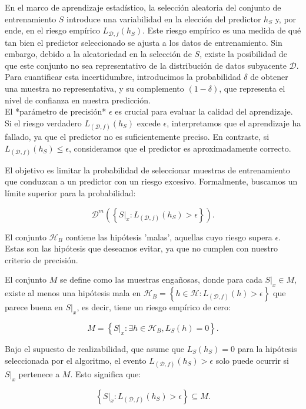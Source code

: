 En el marco de aprendizaje estadístico, la selección aleatoria del conjunto de entrenamiento $S$ introduce una variabilidad en la elección del predictor $h_S$ y, por ende, en el riesgo empírico $L_{\mathcal{D},f}(h_S)$. Este riesgo empírico es una medida de qué tan bien el predictor seleccionado se ajusta a los datos de entrenamiento. Sin embargo, debido a la aleatoriedad en la selección de $S$, existe la posibilidad de que este conjunto no sea representativo de la distribución de datos subyacente $\mathcal{D}$. Para cuantificar esta incertidumbre, introducimos la probabilidad $\delta$ de obtener una muestra no representativa, y su complemento $(1-\delta)$, que representa el nivel de confianza en nuestra predicción.\\

El *parámetro de precisión* $\epsilon$ es crucial para evaluar la calidad del aprendizaje. Si el riesgo verdadero $L_{(\mathcal{D},f)}(h_S)$ excede $\epsilon$, interpretamos que el aprendizaje ha fallado, ya que el predictor no es suficientemente preciso. En contraste, si $L_{(\mathcal{D},f)}(h_S) \leq \epsilon$, consideramos que el predictor es aproximadamente correcto.

El objetivo es limitar la probabilidad de seleccionar muestras de entrenamiento que conduzcan a un predictor con un riesgo excesivo. Formalmente, buscamos un límite superior para la probabilidad:

$$
\mathcal{D}^m \left(\left\{S|_x: L_{(\mathcal{D},f)}(h_S) > \epsilon\right\}\right).
$$

El conjunto $\mathcal{H}_B$ contiene las hipótesis 'malas', aquellas cuyo riesgo supera $\epsilon$. Estas son las hipótesis que deseamos evitar, ya que no cumplen con nuestro criterio de precisión.

El conjunto $M$ se define como las muestras engañosas, donde para cada $S|_x \in M$, existe al menos una hipótesis mala en $\mathcal{H}_B=\left\{h\in \mathcal{H}: L_{(\mathcal{D},f)}(h)>\epsilon\right\}$ que parece buena en $S|_x$, es decir, tiene un riesgo empírico de cero:

$$
M = \left\{S|_x : \exists h \in \mathcal{H}_B, L_{S}(h) = 0\right\}.
$$

Bajo el supuesto de realizabilidad, que asume que $L_S(h_S) = 0$ para la hipótesis seleccionada por el algoritmo, el evento $L_{(\mathcal{D},f)}(h_S) > \epsilon$ solo puede ocurrir si $S|_x$ pertenece a $M$. Esto significa que:

$$
\left\{S|_x : L_{(\mathcal{D},f)}(h_S) > \epsilon\right\} \subseteq M.
$$

